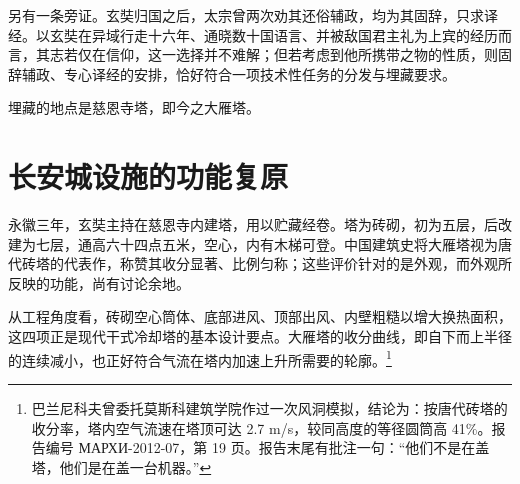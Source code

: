 另有一条旁证。玄奘归国之后，太宗曾两次劝其还俗辅政，均为其固辞，只求译经。以玄奘在异域行走十六年、通晓数十国语言、并被敌国君主礼为上宾的经历而言，其志若仅在信仰，这一选择并不难解；但若考虑到他所携带之物的性质，则固辞辅政、专心译经的安排，恰好符合一项技术性任务的分发与埋藏要求。

埋藏的地点是慈恩寺塔，即今之大雁塔。

\section{长安城设施的功能复原}

永徽三年，玄奘主持在慈恩寺内建塔，用以贮藏经卷。塔为砖砌，初为五层，后改建为七层，通高六十四点五米，空心，内有木梯可登。中国建筑史将大雁塔视为唐代砖塔的代表作，称赞其收分显著、比例匀称；这些评价针对的是外观，而外观所反映的功能，尚有讨论余地。

从工程角度看，砖砌空心筒体、底部进风、顶部出风、内壁粗糙以增大换热面积，这四项正是现代干式冷却塔的基本设计要点。大雁塔的收分曲线，即自下而上半径的连续减小，也正好符合气流在塔内加速上升所需要的轮廓。\footnote{巴兰尼科夫曾委托莫斯科建筑学院作过一次风洞模拟，结论为：按唐代砖塔的收分率，塔内空气流速在塔顶可达 2.7 m/s，较同高度的等径圆筒高 41\%。报告编号 МАРХИ-2012-07，第 19 页。报告末尾有批注一句：“他们不是在盖塔，他们是在盖一台机器。”}

